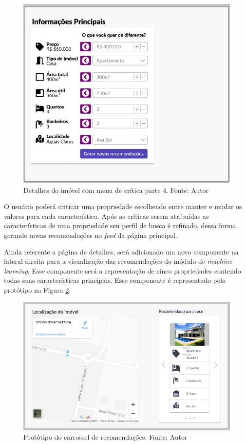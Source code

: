 \begin{figure}[H]
    \centering
    \includegraphics[scale=0.8]{figuras/proposta/prototipo_critico4.png}
    \caption[Detalhes do imóvel com menu de crítica parte 4]{Detalhes do imóvel com menu de crítica parte 4. Fonte: Autor}
    \label{fig:prototipo_critico4}
\end{figure}

O usuário poderá criticar uma propriedade escolhendo entre manter e mudar os valores para cada característica. Após as críticas serem atribuídas as características de uma propriedade seu perfil de busca é refinado, dessa forma gerando novas recomendações no \textit{feed} da página principal.

Ainda referente a página de detalhes, será adicionado um novo componente na lateral direita para a visualização das recomendações do módulo de \textit{machine learning}. Esse componente será a representação de cinco propriedades contendo todas suas características principais. Esse componente é representado pelo protótipo na Figura \ref{fig:prototipo_recommender_system}.

\begin{figure}[H]
    \centering
    \includegraphics[scale=0.53]{figuras/proposta/prototipo_recommender_system.png}
    \caption[Protótipo do carrossel de recomendações]{Protótipo do carrossel de recomendações. Fonte: Autor}
    \label{fig:prototipo_recommender_system}
\end{figure}

